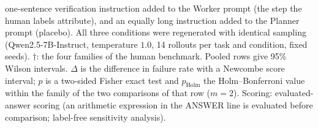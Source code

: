 \begin{table}[t]
{one-sentence verification instruction added to the Worker prompt (the step the human labels
attribute), and an equally long instruction added to the Planner prompt (placebo). All three
conditions were regenerated with identical sampling (Qwen2.5-7B-Instruct, temperature $1.0$,
14 rollouts per task and condition, fixed seeds).
$\dagger$: the four families of the human benchmark. Pooled rows give 95\% Wilson intervals.
$\Delta$ is the difference in failure rate with a Newcombe score interval; $p$ is a two-sided
Fisher exact test and $p_{\mathrm{Holm}}$ the Holm--Bonferroni value within the family of the two
comparisons of that row ($m{=}2$). Scoring: evaluated-answer scoring (an arithmetic expression in the ANSWER line is evaluated before comparison; label-free sensitivity analysis).}
\label{tab:intervention-evaluated-qwen}
\end{table}
